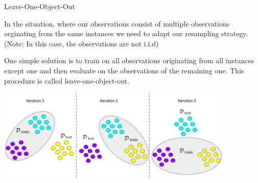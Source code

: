 \begin{vbframe}{Leave-One-Object-Out}

In the situation, where our observations consist of  multiple observations 
orginating from the same instances we need to adapt our resampling strategy. 
(Note: In this case, the observations are not i.i.d)

\lz

One simple solution is to train on all observations originating from all instances
except one and then evaluate on the observations of the remaining one. This
procedure is called leave-one-object-out.
\lz

\begin{knitrout}\scriptsize
{}\color{fgcolor}

{\centering \includegraphics[width=0.85\textwidth]{figure_man/loobject} 

}

\end{knitrout}
\end{vbframe}
\endlecture

